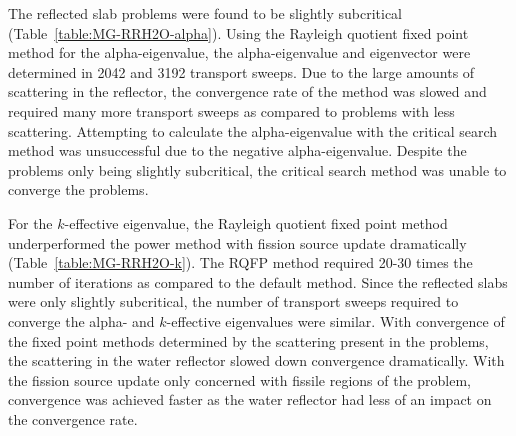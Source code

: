 The reflected slab problems were found to be slightly subcritical (Table~\ref{table:MG-RRH2O-alpha}). Using the Rayleigh quotient fixed point method for the alpha-eigenvalue, the alpha-eigenvalue and eigenvector were determined in 2042 and 3192 transport sweeps. Due to the large amounts of scattering in the reflector, the convergence rate of the method was slowed and required many more transport sweeps as compared to problems with less scattering. Attempting to calculate the alpha-eigenvalue with the critical search method was unsuccessful due to the negative alpha-eigenvalue. Despite the problems only being slightly subcritical, the critical search method was unable to converge the problems.

For the $k$-effective eigenvalue, the Rayleigh quotient fixed point method underperformed the power method with fission source update dramatically (Table~\ref{table:MG-RRH2O-k}). The RQFP method required 20-30 times the number of iterations as compared to the default method. Since the reflected slabs were only slightly subcritical, the number of transport sweeps required to converge the alpha- and $k$-effective eigenvalues were similar. With convergence of the fixed point methods determined by the scattering present in the problems, the scattering in the water reflector slowed down convergence dramatically. With the fission source update only concerned with fissile regions of the problem, convergence was achieved faster as the water reflector had less of an impact on the convergence rate.

